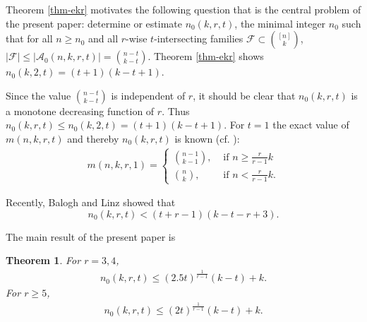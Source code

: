 \documentclass[11pt,a4paper]{article}
\newtheorem{thm}{Theorem}[section]
\newtheorem{false statement}{False statement}
\theoremstyle{definition}
\def\hf{\mathcal{F}}
\def\ha{\mathcal{A}}
\begin{document}
Theorem \ref{thm-ekr} motivates the following question that is the central problem of the present paper: determine or estimate $n_0(k,r,t)$, the minimal integer $n_0$ such that for all $n\geq n_0$ and all $r$-wise $t$-intersecting families $\hf\subset \binom{[n]}{k}$, $|\hf|\leq |\ha_0(n,k,r,t)|= \binom{n-t}{k-t}$. Theorem \ref{thm-ekr} shows $n_0(k,2,t)=(t+1)(k-t+1)$.


Since the value $\binom{n-t}{k-t}$ is independent of $r$, it should  be clear that $n_0(k,r,t)$ is a monotone decreasing function of $r$. Thus $n_0(k,r,t)\leq n_0(k,2,t)=(t+1)(k-t+1)$.  For $t=1$ the exact value of $m(n,k,r,t)$ and  thereby $n_0(k,r,t)$ is known (cf. \cite{F76}):
\begin{align}\label{ineq-1.6}
m(n,k,r,1) = \left\{ \begin{array}{ll}
                 \binom{n-1}{k-1}, & \mbox{ if } n\geq \frac{r}{r-1}k\\[5pt]
                  \binom{n}{k}, & \mbox{ if } n< \frac{r}{r-1}k.
                \end{array}\right.
\end{align}

Recently, Balogh and Linz \cite{BL} showed that
\[
n_0(k,r,t)< (t+r-1)(k-t-r+ 3).
\]

The main result of the present paper is

\begin{thm}\label{thm:main-1}
For $r= 3,4$,
\begin{align}\label{ineq-1.3}
n_0(k,r,t) \leq    \left(2.5 t\right)^{\frac{1}{r-1}}(k-t)+k.
\end{align}
For $r\geq 5$,
\begin{align}\label{ineq-1.3}
n_0(k,r,t) \leq  \left(2t\right)^{\frac{1}{r-1}}(k-t)+k.
\end{align}
\end{thm}
\end{document}
